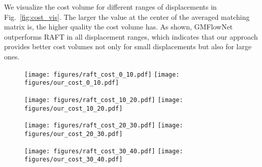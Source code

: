 \documentclass[10pt,twocolumn,letterpaper]{article}
\begin{document}
We visualize the cost volume for different ranges of displacements in Fig.~\ref{fig:cost_vis}. 
The larger the value at the center of the averaged matching matrix is, the higher quality the cost volume has.
As shown, GMFlowNet outperforms RAFT in all displacement ranges, which indicates that our approach provides better cost volumes not only for small displacements but also for large ones.


\begin{figure*}
  \centering
  \begin{subfigure}{0.24\linewidth}
    \texttt{[image: figures/raft\_cost\_0\_10.pdf]}
    \texttt{[image: figures/our\_cost\_0\_10.pdf]}
    \caption{}
  \end{subfigure}
  \begin{subfigure}{0.24\linewidth}
    \texttt{[image: figures/raft\_cost\_10\_20.pdf]}
    \texttt{[image: figures/our\_cost\_10\_20.pdf]}
    \caption{}
  \end{subfigure}
  \begin{subfigure}{0.24\linewidth}
    \texttt{[image: figures/raft\_cost\_20\_30.pdf]}
    \texttt{[image: figures/our\_cost\_20\_30.pdf]}
    \caption{}
  \end{subfigure}
  \begin{subfigure}{0.24\linewidth}
    \texttt{[image: figures/raft\_cost\_30\_40.pdf]}
    \texttt{[image: figures/our\_cost\_30\_40.pdf]}
    \caption{}
  \end{subfigure}
  \caption{{\bf Visualization of cost volumes in different range of displacements.} The first row is for RAFT~\cite{teed2020raft}, and the second row is ours.  refers to regions with displacements below 10 pixels,  for displacements between 10 and 20 pixels,  for displacements between 20 and 30 pixels, and  for displacements larger than 30 pixels.} 
  \label{fig:cost_vis}
\end{figure*}
\end{document}
